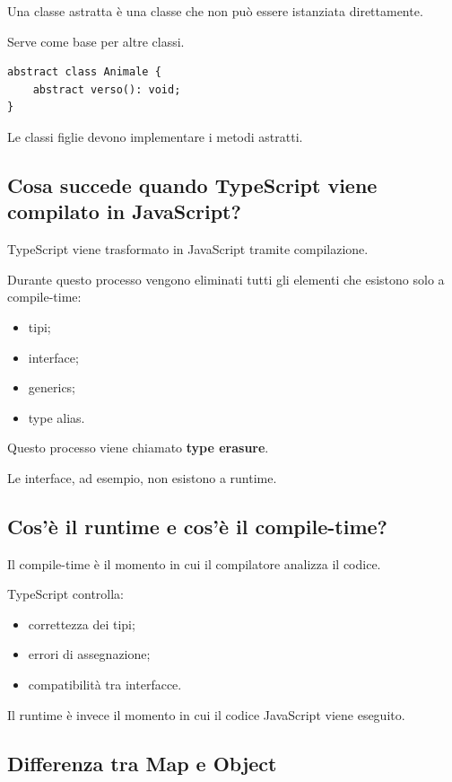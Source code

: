 \documentclass[12pt]{article}
\begin{document}
Una classe astratta è una classe che non può essere istanziata direttamente.

Serve come base per altre classi.

\begin{verbatim}
abstract class Animale {
    abstract verso(): void;
}
\end{verbatim}

Le classi figlie devono implementare i metodi astratti.

\subsection{Cosa succede quando TypeScript viene compilato in JavaScript?}

TypeScript viene trasformato in JavaScript tramite compilazione.

Durante questo processo vengono eliminati tutti gli elementi che esistono solo a compile-time:

\begin{itemize}
    \item tipi;
    \item interface;
    \item generics;
    \item type alias.
\end{itemize}

Questo processo viene chiamato \textbf{type erasure}.

Le interface, ad esempio, non esistono a runtime.


\subsection{Cos'è il runtime e cos'è il compile-time?}

Il compile-time è il momento in cui il compilatore analizza il codice.

TypeScript controlla:

\begin{itemize}
    \item correttezza dei tipi;
    \item errori di assegnazione;
    \item compatibilità tra interfacce.
\end{itemize}

Il runtime è invece il momento in cui il codice JavaScript viene eseguito.


\subsection{Differenza tra Map e Object}
\end{document}
